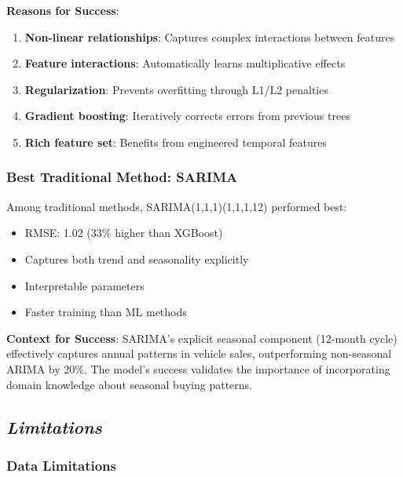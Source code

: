 \documentclass[12pt]{article}
\begin{document}
\textbf{Reasons for Success}:
\begin{enumerate}
    \item \textbf{Non-linear relationships}: Captures complex interactions between features
    \item \textbf{Feature interactions}: Automatically learns multiplicative effects
    \item \textbf{Regularization}: Prevents overfitting through L1/L2 penalties
    \item \textbf{Gradient boosting}: Iteratively corrects errors from previous trees
    \item \textbf{Rich feature set}: Benefits from engineered temporal features
\end{enumerate}

\subsubsection*{Best Traditional Method: SARIMA}

Among traditional methods, SARIMA(1,1,1)(1,1,1,12) performed best:
\begin{itemize}
    \item RMSE: 1.02 (33\% higher than XGBoost)
    \item Captures both trend and seasonality explicitly
    \item Interpretable parameters
    \item Faster training than ML methods
\end{itemize}

\textbf{Context for Success}:
SARIMA's explicit seasonal component (12-month cycle) effectively captures annual patterns in vehicle sales, outperforming non-seasonal ARIMA by 20\%. The model's success validates the importance of incorporating domain knowledge about seasonal buying patterns.

\subsection*{\textit{Limitations}}

\subsubsection*{Data Limitations}
\end{document}
